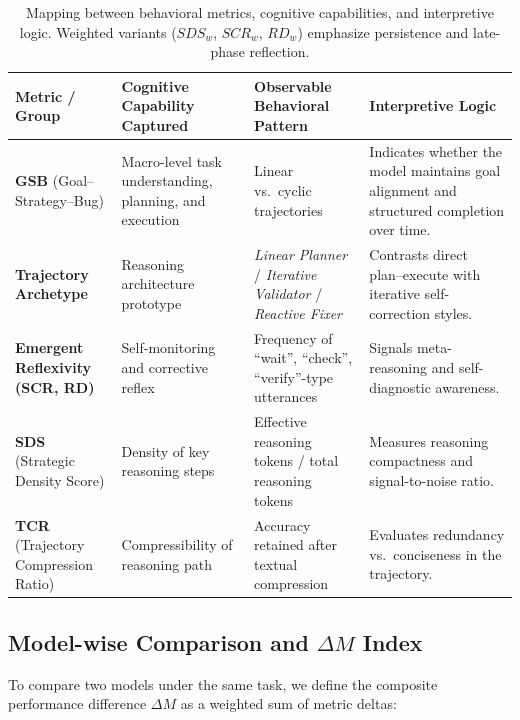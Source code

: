 \documentclass[11pt]{article}
\begin{document}
\begin{table}[htbp]
\renewcommand{\arraystretch}{1.3}
\setlength{\extrarowheight}{2pt}
\centering
\scriptsize
\begin{tabularx}{\textwidth}{
  >{\raggedright\arraybackslash}p{2.2cm}
  >{\raggedright\arraybackslash}p{3.2cm}
  >{\raggedright\arraybackslash}p{3.2cm}
  >{\raggedright\arraybackslash}X
}
\toprule
\textbf{Metric / Group} & \textbf{Cognitive Capability Captured} & \textbf{Observable Behavioral Pattern} & \textbf{Interpretive Logic} \\
\midrule
\textbf{GSB} (Goal--Strategy--Bug) &
Macro-level task understanding, planning, and execution &
Linear vs.\ cyclic trajectories &
Indicates whether the model maintains goal alignment and structured completion over time. \\
\addlinespace[2pt]
\textbf{Trajectory Archetype} &
Reasoning architecture prototype &
\emph{Linear Planner} / \emph{Iterative Validator} / \emph{Reactive Fixer} &
Contrasts direct plan–execute with iterative self-correction styles. \\
\addlinespace[2pt]
\textbf{Emergent Reflexivity (SCR, RD)} &
Self-monitoring and corrective reflex &
Frequency of ``wait'', ``check'', ``verify''-type utterances &
Signals meta-reasoning and self-diagnostic awareness. \\
\addlinespace[2pt]
\textbf{SDS} (Strategic Density Score) &
Density of key reasoning steps &
Effective reasoning tokens / total reasoning tokens &
Measures reasoning compactness and signal-to-noise ratio. \\
\addlinespace[2pt]
\textbf{TCR} (Trajectory Compression Ratio) &
Compressibility of reasoning path &
Accuracy retained after textual compression &
Evaluates redundancy vs.\ conciseness in the trajectory. \\
\bottomrule
\end{tabularx}
\caption{Mapping between behavioral metrics, cognitive capabilities, and interpretive logic. Weighted variants ($SDS_w$, $SCR_w$, $RD_w$) emphasize persistence and late-phase reflection.}
\label{tab:metric-interpretation}
\end{table}

\subsection{Model-wise Comparison and $\Delta M$ Index}

To compare two models under the same task, we define the composite performance
difference $\Delta M$ as a weighted sum of metric deltas:
\end{document}
